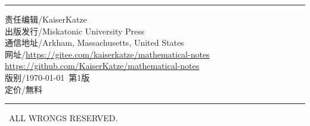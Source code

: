 \begin{titlepage}
\begingroup
\def\MyRule{\raggedright\rule{12cm}{1pt}\vspace{5pt}}
\def\LinkURL#1{\href{#1}{#1}}
\MyRule

\raggedright\noindent%
责任编辑/KaiserKatze \\
出版发行/Miskatonic University Press \\
通信地址/Arkham, Massachusetts, United States \\
网\hspace{2em}址/\LinkURL{https://gitee.com/kaiserkatze/mathematical-notes} \\
\hspace{4em}\newlength{\slashlength}\settowidth{\slashlength}{/}\hspace{\slashlength}%
\LinkURL{https://github.com/KaiserKatze/mathematical-notes} \\
版\hspace{2em}别/\today\ 第1版 \\
定\hspace{2em}价/無料 \\
\MyRule

\textcopyleft\ ALL WRONGS RESERVED.
\endgroup

\end{titlepage}
